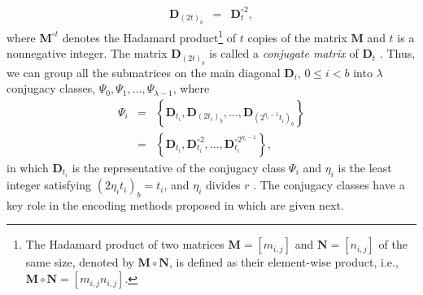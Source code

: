 \documentclass[journal,draftclsnofoot,onecolumn,12pt,twoside]{IEEEtran}
\begin{document}
{\begin{eqnarray}
  \mathbf{D}_{(2t)_b} &=& \mathbf{D}_t^{\circ 2},
\end{eqnarray}
where $\mathbf{M}^{\circ t}$ denotes the  Hadamard product\footnote{The Hadamard product of two matrices
$\mathbf{M}=\left[m_{i,j}\right]$ and $\mathbf{N}=\left[n_{i,j}\right]$ of the same size, denoted by $\mathbf{M}\circ \mathbf{N}$, is defined as their element-wise product, i.e., $\mathbf{M}\circ \mathbf{N}=\left[m_{i,j}n_{i,j}\right]$.} of $t$ copies of the matrix $\mathbf{M}$ and $t$ is a
nonnegative integer. The matrix $\mathbf{D}_{(2t)_b}$ is called a \emph{conjugate matrix} of $\mathbf{D}_t$ \cite{FFT_encoding}. Thus, we can group all the submatrices on the main diagonal $\mathbf{D}_i$, $0\leq i<b$
into $\lambda$ conjugacy classes, $\Psi_0,\Psi_1,\ldots,\Psi_{\lambda-1}$, where
\begin{eqnarray*}
  \Psi_i &=& \left\{\mathbf{D}_{t_i},\mathbf{D}_{(2t_i)_b},\ldots , \mathbf{D}_{(2^{\eta_i-1}t_i)_b}\right\} \\
    &=& \left\{\mathbf{D}_{t_i},\mathbf{D}_{t_i}^{\circ2},\ldots,\mathbf{D}_{t_i}^{\circ 2^{\eta_i-1}} \right\},
\end{eqnarray*}
in which $\mathbf{D}_{t_i}$ is the representative of the conjugacy class $\Psi_i$ and $\eta_i$ is the least integer satisfying $(2\eta_i t_i)_b = t_i$, and $\eta_i$  divides $r$ \cite{blahut}. The conjugacy classes have a key role in the  encoding methods proposed in \cite{FFT_encoding} which are given next.}
\end{document}
